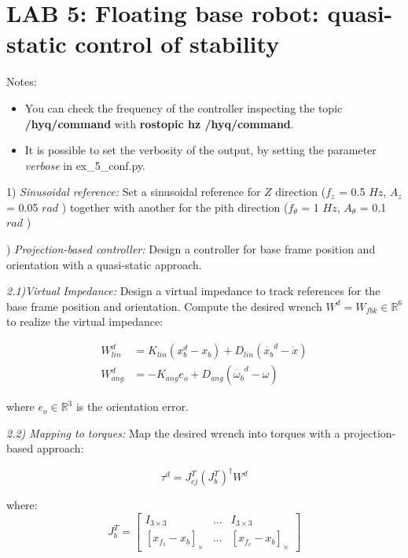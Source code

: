 \documentclass{report}
\newcommand{\Rnum}{\mathbb{R}} %
\newcommand{\mat}[1]{\ensuremath{\begin{bmatrix}#1\end{bmatrix}}}	%
\begin{document}
\section*{LAB 5: Floating base robot: quasi-static control of stability}

Notes:
\begin{itemize}
	\item You can check the frequency of the controller inspecting the topic \textbf{/hyq/command} with \textbf{rostopic hz /hyq/command}.
	\item It is possible to set the verbosity of the output, by setting the parameter  \textit{verbose} in  ex\_5\_conf.py.
\end{itemize}

1) \textit{Sinusoidal reference:} 
Set a sinusoidal reference for $Z$ direction ($f_z$ = 0.5 $Hz$, $A_z$ = 0.05 $rad$ )
together with another for the pith direction ($f_{\theta}$ = 1 $Hz$, $A_{\theta}$ = 0.1 $rad$ )

\quad
 
) \textit{Projection-based controller:} 
Design a controller for base frame position and orientation with a quasi-static approach.

 \textit{2.1)Virtual Impedance:}
Design a virtual impedance to track  references for the base frame position and orientation. Compute the desired wrench $W^d = W_{fbk} \in\Rnum^6$ to realize the virtual impedance:

\begin{align}
W^d_{lin} & = K_{lin} (x^d_b - x_b ) + D_{lin} (\dot{x_b}^d - \dot{x})   \\
W^d_{ang} &=  - K_{ang} e_o + D_{ang} (\dot{\omega_b}^d - \omega)
\end{align}

where $e_o \in \Rnum^3$ is the orientation error. 

\textit{2.2) Mapping to torques:}
Map the desired wrench into torques  with a projection-based approach:

\begin{equation}
\tau^d = J_{cj}^T(J_b^T)^{\dagger} W^d
\end{equation}

where:
\begin{equation}
J_b^T = \mat{I_{3\times3} & \dots & I_{3\times3} \\
			[x_{f_1} - x_b]_{\times} & \dots & [x_{f_c} - x_b]_{\times}}
\label{eq:newton-euler}
\end{equation}
\end{document}
